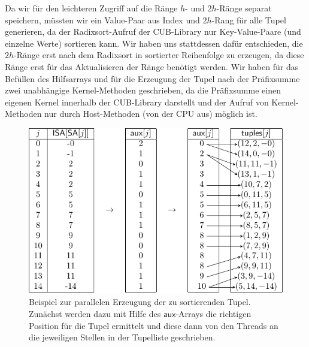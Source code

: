 Da wir für den leichteren Zugriff auf die Ränge $h$- und $2h$-Ränge separat speichern, müssten wir ein Value-Paar aus Index und $2h$-Rang für alle Tupel generieren, da der Radixsort-Aufruf der CUB-Library nur Key-Value-Paare (und einzelne Werte) sortieren kann. Wir haben uns stattdessen dafür entschieden, die $2h$-Ränge erst nach dem Radixsort in sortierter Reihenfolge zu erzeugen, da diese Ränge erst für das Aktualisieren der Ränge benötigt werden. Wir haben für das Befüllen des Hilfsarrays und für die Erzeugung der Tupel nach der Präfixsumme zwei unabhängige Kernel-Methoden geschrieben, da die Präfixsumme einen eigenen Kernel innerhalb der CUB-Library darstellt und der Aufruf von Kernel-Methoden nur durch Host-Methoden (von der CPU aus) möglich ist. 
\begin{center}
\begin{figure}
\includegraphics[scale=1]{kapitel/saca_algorithmen/osipov/create_tuple_example.pdf}
\caption{Beispiel zur parallelen Erzeugung der zu sortierenden Tupel. Zunächst werden dazu mit Hilfe des $\mathsf{aux}$-Arrays die richtigen Position für die Tupel ermittelt und diese dann von den Threads an die jeweiligen Stellen in der Tupelliste geschrieben.}
\end{figure}

\end{center}
